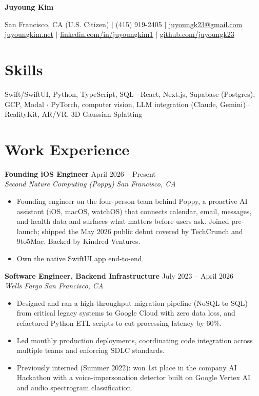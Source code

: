 \documentclass[10pt,letterpaper]{article}
\newcommand{\name}[1]{
  \begin{center}
    {\huge\bfseries #1}
  \end{center}
  \vspace{-1pt}
}
\newcommand{\jobheader}[4]{
  \textbf{#1} \hfill #2 \\
  \textit{#3} \hfill \textit{#4}
  \vspace{-5pt}
}
\begin{document}
\name{Juyoung Kim}
\begin{center}
  San Francisco, CA (U.S. Citizen) $|$ (415) 919-2405 $|$ \href{mailto:juyoungk23@gmail.com}{juyoungk23@gmail.com} \\
  \href{https://juyoungkim.net}{juyoungkim.net} $|$ \href{https://www.linkedin.com/in/juyoungkim1/}{linkedin.com/in/juyoungkim1} $|$ \href{https://github.com/juyoungk23}{github.com/juyoungk23}
\end{center}
\vspace{-5pt}

\section*{Skills}

Swift/SwiftUI, Python, TypeScript, SQL $\cdot$ React, Next.js, Supabase (Postgres), GCP, Modal $\cdot$ PyTorch, computer vision, LLM integration (Claude, Gemini) $\cdot$ RealityKit, AR/VR, 3D Gaussian Splatting

\section*{Work Experience}

\jobheader{Founding iOS Engineer}{April 2026 -- Present}{Second Nature Computing (Poppy)}{San Francisco, CA}
\begin{itemize}
  \item Founding engineer on the four-person team behind Poppy, a proactive AI assistant (iOS, macOS, watchOS) that connects calendar, email, messages, and health data and surfaces what matters before users ask. Joined pre-launch; shipped the May 2026 public debut covered by TechCrunch and 9to5Mac. Backed by Kindred Ventures.
  \item Own the native SwiftUI app end-to-end.
\end{itemize}

\jobheader{Software Engineer, Backend Infrastructure}{July 2023 -- April 2026}{Wells Fargo}{San Francisco, CA}
\begin{itemize}
  \item Designed and ran a high-throughput migration pipeline (NoSQL to SQL) from critical legacy systems to Google Cloud with zero data loss, and refactored Python ETL scripts to cut processing latency by 60\%.
  \item Led monthly production deployments, coordinating code integration across multiple teams and enforcing SDLC standards.
  \item Previously interned (Summer 2022): won 1st place in the company AI Hackathon with a voice-impersonation detector built on Google Vertex AI and audio spectrogram classification.
\end{itemize}
\end{document}
